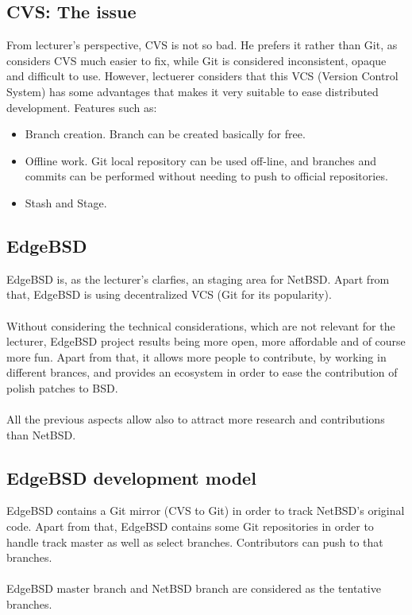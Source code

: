 \documentclass[11pt]{article}
\begin{document}
\subsection{CVS: The issue}
From lecturer's perspective, CVS is not so bad. He prefers it rather than Git, as considers CVS much easier to fix, while Git is considered inconsistent, opaque and difficult to use. However, lectuerer considers that this VCS (Version Control System) has some advantages that makes it very suitable to ease distributed development. Features such as:
\begin{itemize}
\item{Branch creation}. Branch can be created basically for free. 
\item{Offline work}. Git local repository can be used off-line, and branches and commits can be performed without needing to push to official repositories.
\item{Stash and Stage}.
\end{itemize}

\subsection{EdgeBSD}
EdgeBSD is, as the lecturer's clarfies, an staging area for NetBSD. Apart from that, EdgeBSD is using decentralized VCS (Git for its popularity).\\
\\
Without considering the technical considerations, which are not relevant for the lecturer, EdgeBSD project results being more open, more affordable and of course more fun. Apart from that, it allows more people to contribute, by working in different brances, and provides an ecosystem in order to ease the contribution of polish patches to BSD.\\
\\
All the previous aspects allow also to attract more research and contributions than NetBSD.

\subsection{EdgeBSD development model}
EdgeBSD contains a Git mirror (CVS to Git) in order to track NetBSD's original code. Apart from that, EdgeBSD contains some Git repositories in order to handle track master as well as select branches. Contributors can push to that branches.\\
\\
EdgeBSD master branch and NetBSD branch are considered as the tentative branches. 
\end{document}
